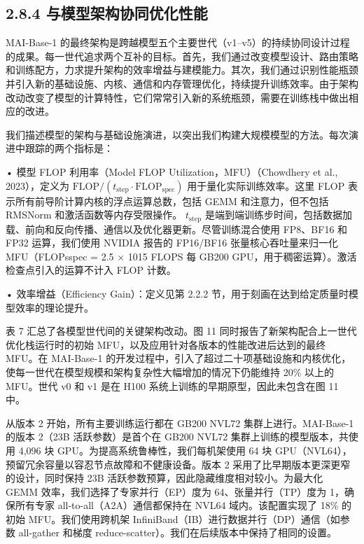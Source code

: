\subsection{2.8.4 与模型架构协同优化性能}\label{cooptimizing-performance-with-model-architecture}

MAI-Base-1 的最终架构是跨越模型五个主要世代（v1--v5）的持续协同设计过程的成果。每一世代追求两个互补的目标。首先，我们通过改变模型设计、路由策略和训练配方，力求提升架构的效率增益与建模能力。其次，我们通过识别性能瓶颈并引入新的基础设施、内核、通信和内存管理优化，持续提升训练效率。由于架构改动改变了模型的计算特性，它们常常引入新的系统瓶颈，需要在训练栈中做出相应的改进。

我们描述模型的架构与基础设施演进，以突出我们构建大规模模型的方法。每次演进中跟踪的两个指标是：

• 模型 FLOP 利用率（Model FLOP Utilization，MFU）（Chowdhery et al., 2023），定义为
\(\mathrm { F L O P } / ( t _ { \mathrm { s t e p } } { \cdot } \mathrm { F L O P } _ { \mathrm { s p e c } } )\)
用于量化实际训练效率。这里 FLOP 表示所有前导阶计算内核的浮点运算总数，包括 GEMM 和注意力，但不包括 RMSNorm 和激活函数等内存受限操作。
\(t _ { \mathrm { s t e p } }\) 是端到端训练步时间，包括数据加载、前向和反向传播、通信以及优化器更新。尽管训练混合使用 FP8、BF16 和 FP32 运算，我们使用 NVIDIA 报告的 FP16/BF16 张量核心吞吐量来归一化 MFU（FLOPsspec = 2.5 $\times$ 1015 FLOPS 每 GB200 GPU，用于稠密运算）。激活检查点引入的运算不计入 FLOP 计数。

• 效率增益（Efficiency Gain）：定义见第 2.2.2 节，用于刻画在达到给定质量时模型效率的理论提升。

表 7 汇总了各模型世代间的关键架构改动。图 11 同时报告了新架构配合上一世代优化栈运行时的初始 MFU，以及应用针对各版本的性能改进后达到的最终 MFU。在 MAI-Base-1 的开发过程中，引入了超过二十项基础设施和内核优化，使每一世代在模型规模和架构复杂性大幅增加的情况下仍能维持 20\% 以上的 MFU。世代 v0 和 v1 是在 H100 系统上训练的早期原型，因此未包含在图 11 中。

从版本 2 开始，所有主要训练运行都在 GB200 NVL72 集群上进行。MAI-Base-1 的版本 2（23B 活跃参数）是首个在 GB200 NVL72 集群上训练的模型版本，共使用 4,096 块 GPU。为提高系统鲁棒性，我们每机架使用 64 块 GPU（NVL64），预留冗余容量以容忍节点故障和不健康设备。版本 2 采用了比早期版本更深更窄的设计，同时保持 23B 活跃参数预算，因此隐藏维度相对较小。为最大化 GEMM 效率，我们选择了专家并行（EP）度为 64、张量并行（TP）度为 1，确保所有专家 all-to-all（A2A）通信都保持在 NVL64 域内。该配置实现了 18\% 的初始 MFU。我们使用跨机架 InfiniBand（IB）进行数据并行（DP）通信（如参数 all-gather 和梯度 reduce-scatter）。我们在后续版本中保持了相同的设置。



